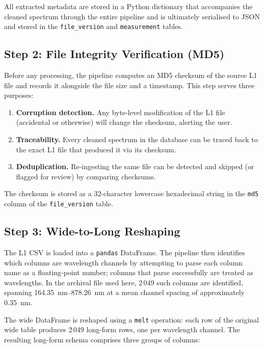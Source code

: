 \documentclass[a4paper,twocolumn,10pt]{article}
\begin{document}
All extracted metadata are stored in a Python dictionary that
accompanies the cleaned spectrum through the entire pipeline and is
ultimately serialised to JSON and stored in the \texttt{file\_version}
and \texttt{measurement} tables.

\subsection{Step 2: File Integrity Verification (MD5)}

Before any processing, the pipeline computes an MD5 checksum of the
source L1 file and records it alongside the file size and a
timestamp.  This step serves three purposes:

\begin{enumerate}[nosep,leftmargin=*]
  \item \textbf{Corruption detection.}  Any byte-level modification of
    the L1 file (accidental or otherwise) will change the checksum,
    alerting the user.
  \item \textbf{Traceability.}  Every cleaned spectrum in the database
    can be traced back to the exact L1 file that produced it via its
    checksum.
  \item \textbf{Deduplication.}  Re-ingesting the same file can be
    detected and skipped (or flagged for review) by comparing
    checksums.
\end{enumerate}

The checksum is stored as a 32-character lowercase hexadecimal string
in the \texttt{md5} column of the \texttt{file\_version} table.

\subsection{Step 3: Wide-to-Long Reshaping}

The L1 CSV is loaded into a \texttt{pandas} DataFrame.  The pipeline
then identifies which columns are wavelength channels by attempting to
parse each column name as a floating-point number; columns that parse
successfully are treated as wavelengths.  In the archival file used
here, 2\,049 such columns are identified, spanning
\SIrange{164.35}{878.26}{\nano\metre} at a mean channel spacing of
approximately \SI{0.35}{\nano\metre}.

The wide DataFrame is reshaped using a \texttt{melt} operation: each
row of the original wide table produces 2\,049 long-form rows, one
per wavelength channel.  The resulting long-form schema comprises
three groups of columns:
\end{document}
